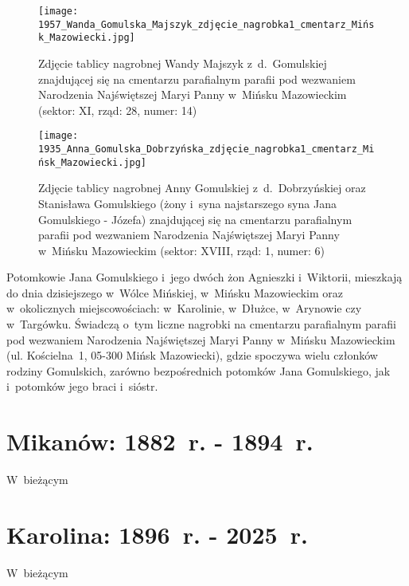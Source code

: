 \begin{figure}[!ht]
    \vspace*{0.4cm}
    \centering \texttt{[image: 
        1957\_Wanda\_Gomulska\_Majszyk\_zdjęcie\_nagrobka1\_cmentarz\_Mińsk\_Mazowiecki.jpg]}
    \captionsetup{format=hang}
    \caption{Zdjęcie tablicy nagrobnej Wandy Majszyk z~d.~Gomulskiej
    znajdującej się na cmentarzu parafialnym parafii pod wezwaniem Narodzenia
    Najświętszej Maryi Panny w~Mińsku Mazowieckim (sektor: XI, rząd: 28,
    numer: 14)}
    \label{fig:wgomulska_1957}
\end{figure}

\begin{figure}[!ht]
    \vspace*{0.4cm}
    \centering \texttt{[image: 
        1935\_Anna\_Gomulska\_Dobrzyńska\_zdjęcie\_nagrobka1\_cmentarz\_Mińsk\_Mazowiecki.jpg]}
    \captionsetup{format=hang}
    \caption{Zdjęcie tablicy nagrobnej Anny Gomulskiej z~d.~Dobrzyńskiej oraz
    Stanisława Gomulskiego (żony i~syna najstarszego syna Jana Gomulskiego -
    Józefa) znajdującej się na cmentarzu parafialnym parafii pod wezwaniem
    Narodzenia Najświętszej Maryi Panny w~Mińsku Mazowieckim (sektor: XVIII,
    rząd: 1, numer: 6)}
    \label{fig:agomulska_1935}
\end{figure}

Potomkowie Jana Gomulskiego i~jego dwóch żon Agnieszki i~Wiktorii, mieszkają
do dnia dzisiejszego w~Wólce Mińskiej, w~Mińsku Mazowieckim oraz w~okolicznych
miejscowościach: w~Karolinie, w~Dłużce, w~Arynowie czy w~Targówku. Świadczą
o~tym liczne nagrobki na cmentarzu parafialnym parafii pod wezwaniem
Narodzenia Najświętszej Maryi Panny w~Mińsku Mazowieckim (ul. Kościelna~1,
05-300 Mińsk Mazowiecki), gdzie spoczywa wielu członków rodziny Gomulskich,
zarówno bezpośrednich potomków Jana Gomulskiego, jak i~potomków jego braci
i~sióstr.

\newpage
\ifodd\value{page}\hbox{}\newpage\fi



\section{Mikanów: 1882~r. - 1894~r.}

W~bieżącym


\newpage
\ifodd\value{page}\hbox{}\newpage\fi



\section{Karolina: 1896~r. - 2025~r.}

W~bieżącym
